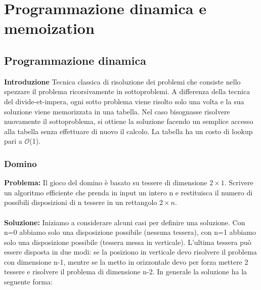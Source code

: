 \documentclass[../cheatSheetAlgoritmi.tex]{subfiles}
\begin{document}
\section{Programmazione dinamica e memoization}
\subsection{Programmazione dinamica}
\textbf{Introduzione} Tecnica classica di risoluzione dei problemi che consiste nello spezzare il problema ricorsivamente in sottoproblemi. A differenza della tecnica del divide-et-impera, ogni sotto problema viene risolto solo una volta e la sua soluzione viene memorizzata in una tabella. Nel caso bisognasse risolvere nuovamente il sottoproblema, si ottiene la soluzione facendo un semplice accesso alla tabella senza effettuare di nuovo il calcolo. La tabella ha un costo di lookup pari a  $\mathcal{O}$(1). 

\subsubsection{Domino}
\textbf{Problema:} Il gioco del domino è basato su tessere di dimensione $2\times1$. Scrivere un algoritmo efficiente che prenda in input un intero n e restituisca il numero di possibili disposizioni di n tessere in un rettangolo $2\times n$. \\\\
\textbf{Soluzione:} Iniziamo a considerare alcuni casi per definire una soluzione. Con n=0 abbiamo solo una disposizione possibile (nessuna tessera), con n=1 abbiamo solo una disposizione possibile (tessera messa in verticale). L'ultima tessera può essere disposta in due modi: se la posiziono in verticale devo risolvere il problema con dimensione n-1, mentre se la metto in orizzontale devo per forza mettere 2 tessere e risolvere il problema di dimensione n-2. In generale la soluzione ha la seguente forma: 
\end{document}
